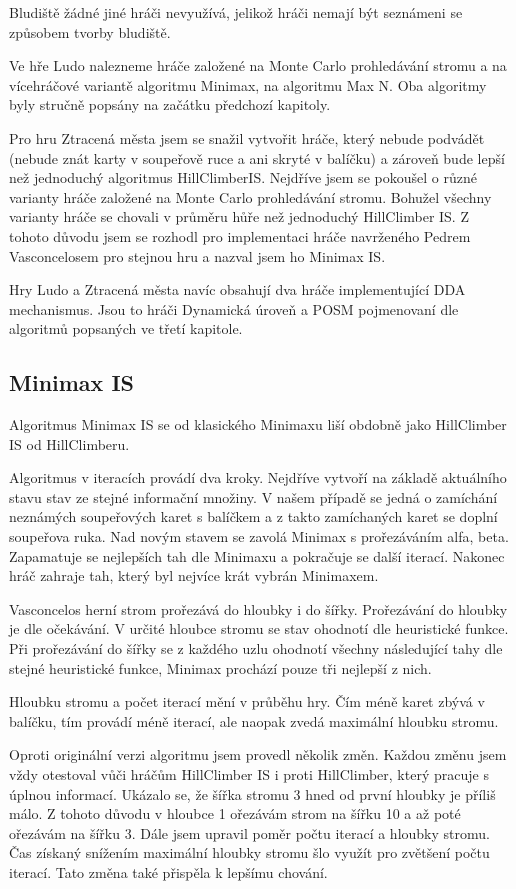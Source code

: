 Bludiště žádné jiné hráči nevyužívá, jelikož hráči nemají být seznámeni se způsobem tvorby bludiště.

Ve hře Ludo nalezneme hráče založené na Monte Carlo prohledávání stromu a na vícehráčové variantě algoritmu Minimax, na algoritmu Max N. Oba algoritmy byly stručně popsány na začátku předchozí kapitoly.

Pro hru Ztracená města jsem se snažil vytvořit hráče, který nebude podvádět (nebude znát karty v soupeřově ruce a ani skryté v balíčku) a zároveň bude lepší než jednoduchý algoritmus HillClimberIS.
Nejdříve jsem se pokoušel o různé varianty hráče založené na Monte Carlo prohledávání stromu. Bohužel všechny varianty hráče se chovali v průměru hůře než jednoduchý HillClimber IS. Z tohoto důvodu jsem se rozhodl pro implementaci hráče navrženého Pedrem Vasconcelosem \cite{ch5LT} pro stejnou hru a nazval jsem ho Minimax IS.

Hry Ludo a Ztracená města navíc obsahují dva hráče implementující DDA mechanismus. Jsou to hráči Dynamická úroveň a POSM pojmenovaní dle algoritmů popsaných ve třetí kapitole.

\subsection{Minimax IS}

Algoritmus Minimax IS se od klasického Minimaxu liší obdobně jako HillClimber IS od HillClimberu. 

Algoritmus v iteracích provádí dva kroky. Nejdříve vytvoří na základě aktuálního stavu stav ze stejné informační množiny. V našem případě se jedná o zamíchání neznámých soupeřových karet s balíčkem a z takto zamíchaných karet se doplní soupeřova ruka. Nad novým stavem se zavolá Minimax s prořezáváním alfa, beta. Zapamatuje se nejlepších tah dle Minimaxu a pokračuje se další iterací. Nakonec hráč zahraje tah, který byl nejvíce krát vybrán Minimaxem.

Vasconcelos herní strom prořezává do hloubky i do šířky. Prořezávání do hloubky je dle očekávání. V určité hloubce stromu se stav ohodnotí dle heuristické funkce. Při prořezávání do šířky se z každého uzlu ohodnotí všechny následující tahy dle stejné heuristické funkce, Minimax prochází pouze tři nejlepší z nich.

Hloubku stromu a počet iterací mění v průběhu hry. Čím méně karet zbývá v balíčku, tím provádí méně iterací, ale naopak zvedá maximální hloubku stromu.

Oproti originální verzi algoritmu jsem provedl několik změn. Každou změnu jsem vždy otestoval vůči hráčům HillClimber IS i proti HillClimber, který pracuje s úplnou informací. Ukázalo se, že šířka stromu 3 hned od první hloubky je příliš málo. Z tohoto důvodu v hloubce 1 ořezávám strom na šířku 10 a až poté ořezávám na šířku 3. Dále jsem upravil poměr počtu iterací a hloubky stromu. Čas získaný snížením maximální hloubky stromu šlo využít pro zvětšení počtu iterací. Tato změna také přispěla k lepšímu chování. 

